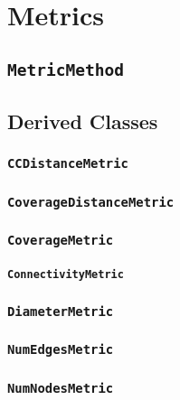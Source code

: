 \chapter{Metrics}

\section{\texttt{MetricMethod}}

\section{Derived Classes}

\subsection{\texttt{CCDistanceMetric}}

\subsection{\texttt{CoverageDistanceMetric}}

\subsection{\texttt{CoverageMetric}}

\subsubsection{\texttt{ConnectivityMetric}}

\subsection{\texttt{DiameterMetric}}

\subsection{\texttt{NumEdgesMetric}}

\subsection{\texttt{NumNodesMetric}}

